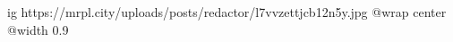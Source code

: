  
 
 
 
 

\ifcmt
  ig https://mrpl.city/uploads/posts/redactor/l7vvzettjcb12n5y.jpg
  @wrap center
  @width 0.9
\fi
